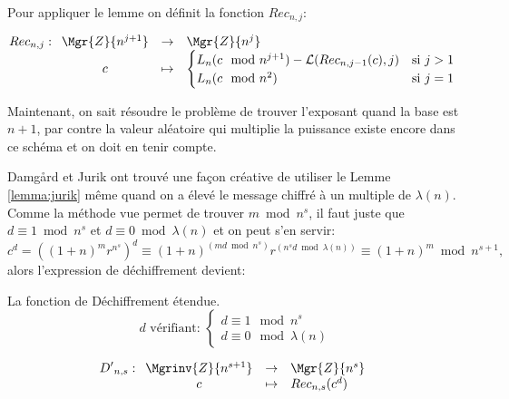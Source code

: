 	Pour appliquer le lemme on définit la fonction $Rec_{n,j}$:

	\begin{equation}\label{equation:rec}
			{Rec}_{n,j} : \begin{array}[t]{ccl} \Mgr{Z}{n^{j+1}} &\rightarrow &   \Mgr{Z}{n^{j}}  \\
                               	c&\mapsto&\begin{cases} L_n(c\mod{n^{j+1}}) - \mathcal{L}({Rec}_{n,j-1}(c),j)&\text{si }j>1 \\%
				L_n(c\mod{n^{2}}) &\text{si }j=1\end{cases} 
			\end{array}
	\end{equation}

	Maintenant, on sait résoudre le problème de trouver l'exposant quand la base est $n+1$, par contre la valeur aléatoire qui multiplie la 
	puissance existe encore dans ce schéma  et on doit en tenir compte. 
	


	
	
	Damgård et Jurik ont trouvé une façon créative de utiliser le Lemme \ref{lemma:jurik} même quand on a élevé le message chiffré à un multiple de 
	$\lambda(n)$. Comme la méthode vue permet de trouver $m \bmod n^s$, il faut juste que $d\equiv 1 \bmod n^s$ et $d\equiv 0 \bmod{\lambda(n)}$ et on peut s'en servir:
	\begin{equation} 
		\label{eq:lambdad} 
		c^d = \left((1+n)^mr^{n^s}\right)^{d} \equiv  (1+n)^{(md \bmod{n^s})}r^{(n^sd \bmod{\lambda(n)})} \equiv  (1+n)^{m}\bmod{n^{s+1}}\text{,}
	\end{equation}
	alors l'expression de déchiffrement devient:

	\begin{definition} La fonction de Déchiffrement étendue.
		\begin{equation}\label{eq:defd}
		d\text{ vérifiant: }
			\begin{cases}%
				d \equiv 1 \mod{n^s} \\%
				d \equiv 0 \mod{\lambda(n)}%
			\end{cases}
		\end{equation}


		\begin{equation}
			{D'}_{n,s} : \begin{array}[t]{ccl} \Mgrinv{Z}{n^{s+1}} &\rightarrow &   \Mgr{Z}{n^s}  \\
			c&\mapsto& Rec_{n,s}(c^{d})
			\end{array}
		\end{equation}

	\end{definition}


